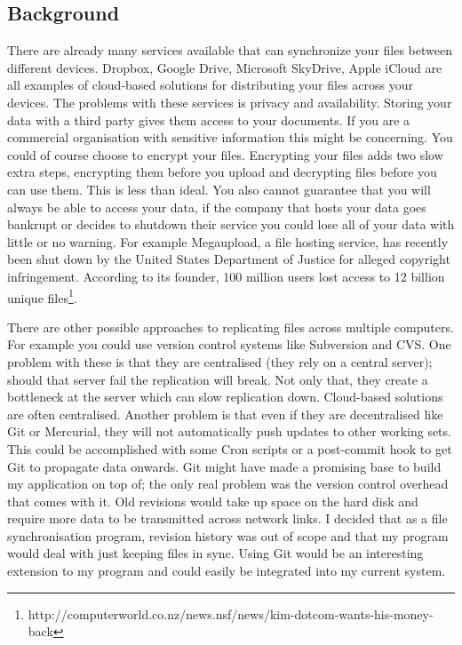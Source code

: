 \documentclass[12pt]{article}
\begin{document}
\subsection{Background}
There are already many services available
that can synchronize your files between different devices. 
Dropbox, Google Drive, Microsoft SkyDrive, Apple iCloud
are all examples of cloud-based solutions for distributing
your files across your devices. The problems with these
services is privacy and availability. Storing your data with a
third party gives them access to your documents. If you
are a commercial organisation with sensitive information
this might be concerning. You could
of course choose to encrypt your files. Encrypting your files adds
two slow extra steps, encrypting them before you upload and decrypting
files before you can use them. This is less than ideal. 
You also cannot guarantee
that you will always be able to access your data, if
the company that hosts your data goes bankrupt or
decides to shutdown their service
you could lose all
of your data with little or no warning. 
For example Megaupload, a file hosting service,
has recently been shut down by the United States Department of
Justice for alleged copyright infringement. According to
its founder, 100 million users lost access to 12 billion
unique files\footnote{http://computerworld.co.nz/news.nsf/news/kim-dotcom-wants-his-money-back}.

There are other possible approaches to replicating files
across multiple computers. For example you could use
version control systems like Subversion and
CVS. One problem with these is that they are
centralised (they rely on a central server); should that
server fail the replication will break. Not only
that, they create a bottleneck at the server which can slow
replication down.
Cloud-based solutions are often centralised. 
Another problem is that even if they are decentralised
like Git or Mercurial, they will not automatically push updates to other
working sets. This could be accomplished with some
Cron scripts or a post-commit hook to get Git to
propagate data onwards. Git might have made a promising
base to build my application on top of; the only real
problem was the version control overhead that comes with
it. Old revisions would take up space on the hard disk
and require more data to be transmitted across network links.
I decided that as a file synchronisation program, revision
history was out of scope and that my program would
deal with just keeping files in sync. Using Git would be
an interesting extension to my program and could easily
be integrated into my current system.
\end{document}
